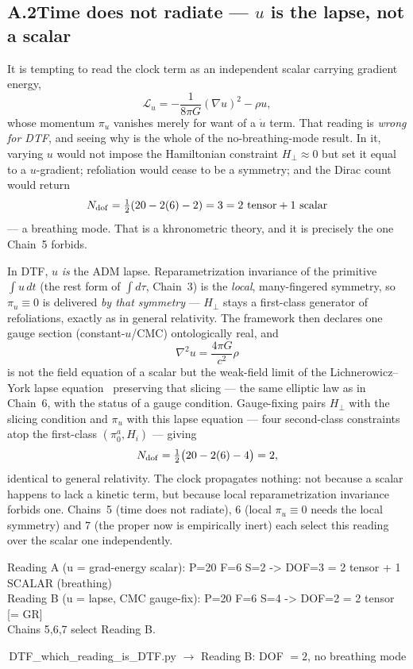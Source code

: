 \documentclass[11pt]{article}
\newcommand{\pychip}[2]{{\footnotesize\colorbox{cbPyBg}{\ttfamily\,#1\,}\,{\color{gray}$\to$ #2}}}
\begin{document}
\subsection*{A.2\quad Time does not radiate --- $u$ is the lapse, not a scalar}
It is tempting to read the clock term as an independent scalar carrying gradient energy,
\[ \mathcal L_u=-\frac{1}{8\pi G}(\nabla u)^2-\rho u, \]
whose momentum $\pi_u$ vanishes merely for want of a $\dot u$ term. That
reading is \emph{wrong for DTF}, and seeing why is the whole of the no-breathing-mode result. In it,
varying $u$ would not impose the Hamiltonian constraint $H_\perp\approx0$ but set it equal to a
$u$-gradient; refoliation would cease to be a symmetry; and the Dirac count would return
\[ N_{\rm dof}=\tfrac12(20-2(6)-2)=3=2\ \text{tensor}+1\ \text{scalar} \]
--- a breathing mode. That is a khronometric theory, and it is precisely the one Chain~5 forbids.

In DTF, $u$ \emph{is} the ADM lapse. Reparametrization invariance of the primitive $\int u\,dt$ (the rest form of $\int d\tau$, Chain~3) is the
\emph{local}, many-fingered symmetry, so $\pi_u\equiv0$ is delivered \emph{by that symmetry} --- $H_\perp$
stays a first-class generator of refoliations, exactly as in general relativity. The framework then declares
one gauge section (constant-$u$/CMC) ontologically real, and
\[ \nabla^2u=\frac{4\pi G}{c^2}\rho \]
is not the field equation of a scalar but the weak-field limit of the Lichnerowicz--York lapse
equation~\cite{Lichnerowicz1944,York1972} preserving that slicing --- the same
elliptic law as in Chain~6, with the status of a gauge condition. Gauge-fixing pairs $H_\perp$ with the
slicing condition and $\pi_u$ with this lapse equation --- four second-class constraints atop the
first-class $(\pi^a_0,H_i)$ --- giving
\[ N_{\rm dof}=\tfrac12\big(20-2(6)-4\big)=2, \]
identical to general relativity. The clock propagates nothing: not because a scalar happens to lack a
kinetic term, but because local reparametrization invariance forbids one. Chains~5 (time does not radiate),
6 (local $\pi_u\equiv0$ needs the local symmetry) and 7 (the proper now is empirically inert) each select
this reading over the scalar one independently.
\begin{tcolorbox}[colback=cbPyBg,colframe=cbNodeFr,boxrule=0.5pt,arc=2pt,left=8pt,right=8pt,top=4pt,bottom=4pt]
\ttfamily\small Reading A (u = grad-energy scalar): P=20 F=6 S=2 -> DOF=3 = 2 tensor + 1 SCALAR (breathing)\\
Reading B (u = lapse, CMC gauge-fix): P=20 F=6 S=4 -> DOF=2 = 2 tensor  [= GR]\\
Chains 5,6,7 select Reading B.
\end{tcolorbox}
\pychip{DTF\_which\_reading\_is\_DTF.py}{Reading B: DOF $=2$, no breathing mode}
\end{document}
